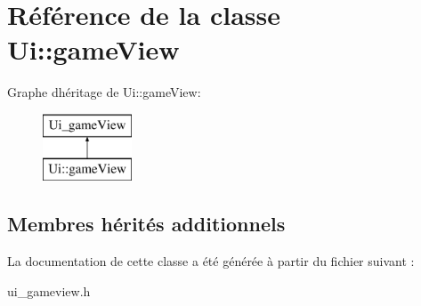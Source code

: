 \hypertarget{class_ui_1_1game_view}{}\section{Référence de la classe Ui\+::game\+View}
\label{class_ui_1_1game_view}
Graphe d\textquotesingle{}héritage de Ui\+::game\+View\+:\begin{figure}[H]
\begin{center}
\leavevmode
\includegraphics[height=2.000000cm]{class_ui_1_1game_view}
\end{center}
\end{figure}
\subsection*{Membres hérités additionnels}


La documentation de cette classe a été générée à partir du fichier suivant \+:\begin{DoxyCompactItemize}
\item 
ui\+\_\+gameview.\+h\end{DoxyCompactItemize}
